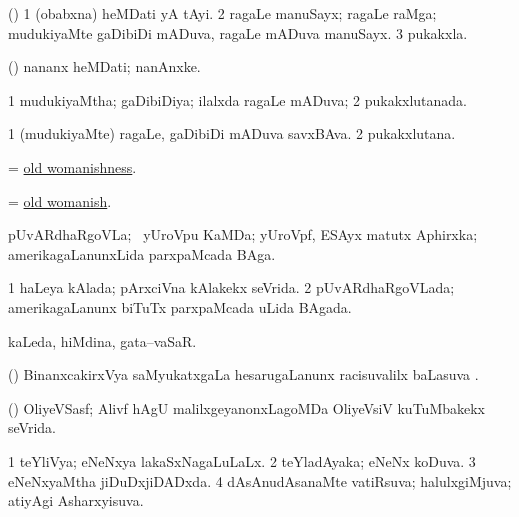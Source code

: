 \bentry
{}
\gl{\nA}
\bmng
(\AmA) 
\bnum
\num{1} (obabxna) heMDati yA tAyi. 
\num{2} ragaLe manuSayx; ragaLe raMga; mudukiyaMte gaDibiDi mADuva, ragaLe mADuva manuSayx. 
\num{3} pukakxla. 
\enum
\emng

\noindent
\gl{\pagu}
\bmng
{} (\AmA) nananx heMDati; nanAnxke. 
\emng
\eentry

\bentry
{}
\gl{\gu}
\bmng
\bnum
\num{1} mudukiyaMtha; gaDibiDiya; ilalxda ragaLe mADuva; 
\num{2} pukakxlutanada. 
\enum
\emng
\eentry

\bentry
{}
\gl{\nA}
\bmng
\bnum
\num{1} (mudukiyaMte) ragaLe, gaDibiDi mADuva savxBAva. 
\num{2} pukakxlutana. 
\enum
\emng
\eentry

\bentry
{}
\gl{\nA}
\bmng
= \hyperlink{old womanishness}{old womanishness}. 
\emng
\eentry

\bentry
{}
\gl{\gu}
\bmng
= \hyperlink{old womanish}{old womanish}. 
\emng
\eentry

\bentry
{}
\gl{\nA}
\bmng
pUvARdhaRgoVLa; \kanmu\ yUroVpu KaMDa; yUroVpf, ESAyx matutx Aphirxka; amerikagaLanunxLida parxpaMcada BAga. 
\emng
\eentry

\bentry
{}
\gl{\gu}
\bmng
\bnum
\num{1} haLeya kAlada; pArxciVna kAlakekx seVrida. 
\num{2} pUvARdhaRgoVLada; amerikagaLanunx biTuTx parxpaMcada uLida BAgada. 
\enum
\emng
\eentry

\bentry
{}
\gl{\nA}
\bmng
kaLeda, hiMdina, gata--vaSaR. 
\emng
\eentry

\bentry
{}
\gl{\saupa}
\bmng
(\ravi) BinanxcakirxVya  saMyukatxgaLa hesarugaLanunx racisuvalilx baLasuva \saupa. 
\emng
\eentry

\bentry
{}
\gl{\gu}
\bmng
(\savi) OliyeVSasf; Alivf hAgU malilxgeyanonxLagoMDa OliyeVsiV kuTuMbakekx seVrida. 
\emng
\eentry

\bentry
{}
\gl{\gu}
\bmng
\bnum
\num{1} teYliVya; eNeNxya lakaSxNagaLuLaLx. 
\num{2} teYladAyaka; eNeNx koDuva. 
\num{3} eNeNxyaMtha jiDuDxjiDADxda. 
\num{4} dAsAnudAsanaMte vatiRsuva; halulxgiMjuva; atiyAgi Asharxyisuva. 
\enum
\emng
\eentry

